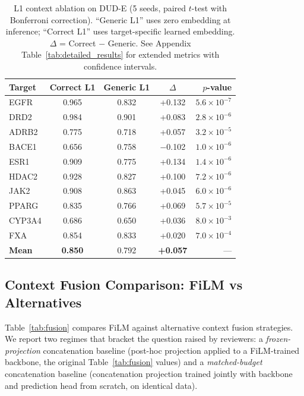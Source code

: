 \documentclass{article}
\begin{document}
\begin{table}[t]
\vspace{-2mm}
\caption{L1 context ablation on DUD-E (5 seeds, paired $t$-test with Bonferroni correction). ``Generic L1'' uses zero embedding at inference; ``Correct L1'' uses target-specific learned embedding. $\Delta$ = Correct $-$ Generic. See Appendix Table~\ref{tab:detailed_results} for extended metrics with confidence intervals.}
\label{tab:l1_ablation}
\centering
\small
\begin{tabular*}{\textwidth}{@{\extracolsep{\fill}}lcccr@{}}
\toprule
Target & Correct L1 & Generic L1 & $\Delta$ & $p$-value \\
\midrule
EGFR & 0.965 & 0.832 & +0.132 & $5.6 \times 10^{-7}$ \\
DRD2 & 0.984 & 0.901 & +0.083 & $2.8 \times 10^{-6}$ \\
ADRB2 & 0.775 & 0.718 & +0.057 & $3.2 \times 10^{-5}$ \\
BACE1 & 0.656 & 0.758 & $-$0.102 & $1.0 \times 10^{-6}$ \\
ESR1 & 0.909 & 0.775 & +0.134 & $1.4 \times 10^{-6}$ \\
HDAC2 & 0.928 & 0.827 & +0.100 & $7.2 \times 10^{-6}$ \\
JAK2 & 0.908 & 0.863 & +0.045 & $6.0 \times 10^{-6}$ \\
PPARG & 0.835 & 0.766 & +0.069 & $5.7 \times 10^{-5}$ \\
CYP3A4 & 0.686 & 0.650 & +0.036 & $8.0 \times 10^{-3}$ \\
FXA & 0.854 & 0.833 & +0.020 & $7.0 \times 10^{-4}$ \\
\midrule
\textbf{Mean} & \textbf{0.850} & 0.792 & \textbf{+0.057} & --- \\
\bottomrule
\end{tabular*}
\vspace{-2mm}
\end{table}

\subsection{Context Fusion Comparison: FiLM vs Alternatives}
\label{sec:fair_fusion}

Table~\ref{tab:fusion} compares FiLM against alternative context fusion strategies. We report two regimes that bracket the question raised by reviewers: a \emph{frozen-projection} concatenation baseline (post-hoc projection applied to a FiLM-trained backbone, the original Table~\ref{tab:fusion} values) and a \emph{matched-budget} concatenation baseline (concatenation projection trained jointly with backbone and prediction head from scratch, on identical data).
\end{document}
